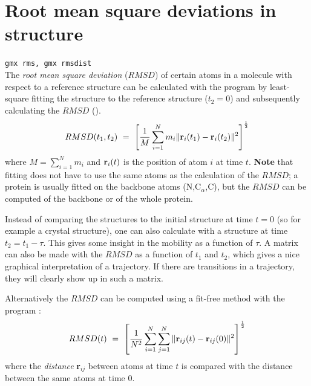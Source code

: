 
\section{Root mean square deviations in structure}
\label{sec:rmsd}
{\tt gmx rms, gmx rmsdist}\\
The {\em root mean square deviation} ($RMSD$) of certain atoms in a molecule
with respect to a reference structure can be calculated with the program 
{\tt {}} by least-square fitting the structure to the reference structure
($t_2 = 0$) and subsequently calculating the $RMSD$ ().
\begin{equation}
RMSD(t_1,t_2) ~=~ \left[\frac{1}{M} \sum_{i=1}^N m_i \|{\bf r}_i(t_1)-{\bf r}_i(t_2)\|^2 \right]^{\frac{1}{2}}
\label{eqn:rmsd}
\end{equation}
where $M = \sum_{i=1}^N m_i$ and ${\bf r}_i(t)$ is the position of atom $i$ at time $t$.
{\bf Note} that fitting does not have to use the same atoms as the calculation
of the $RMSD$; {\eg} a protein is usually fitted on the backbone atoms
(N,C$_{\alpha}$,C), but the $RMSD$ can be computed of the backbone
or of the whole protein.

Instead of comparing the structures to the initial structure at time $t=0$ 
(so for example a crystal structure), one can also calculate  
with a structure at time $t_2=t_1-\tau$.
This gives some insight in the mobility as a function of $\tau$.
A matrix can also be made with the $RMSD$ as a function of $t_1$ and $t_2$,
which gives a nice graphical interpretation of a trajectory.
If there are transitions in a trajectory, they will clearly show up in
such a matrix.

Alternatively the $RMSD$ can be computed using a fit-free method with the 
program {\tt {}}:
\begin{equation}
RMSD(t) ~=~     \left[\frac{1}{N^2}\sum_{i=1}^N \sum_{j=1}^N    \|{\bf r}_{ij}(t)-{\bf r}_{ij}(0)\|^2\right]^{\frac{1}{2}}
\label{eqn:rmsdff}
\end{equation}
where the {\em distance} {\bf r}$_{ij}$ between atoms at time $t$ 
is compared with the distance between the same atoms at time $0$.


